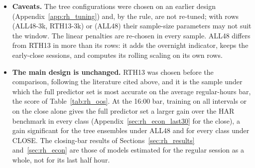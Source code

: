 \begin{itemize}
\item \textbf{Caveats.} The tree configurations were chosen on an earlier design (Appendix~\ref{app:rh_tuning}) and,
  by the rule, are not re-tuned; with \rhtaRowsSmall{} rows (ALL48-3k, RTH13-3k) or \rhtaRowsAll{} (ALL48) their
  sample-size parameters may not suit the window. The linear penalties are re-chosen in every sample. ALL48 differs
  from RTH13 in more than its rows: it adds the overnight indicator, keeps the early-close sessions, and computes its
  rolling scaling on its own rows.
\item \textbf{The main design is unchanged.} RTH13 was chosen before the comparison, following the literature cited
  above, and it is the sample under which the full predictor set is most accurate on the average regular-hours bar,
  the score of Table~\ref{tab:rh_oos}. At the 16:00 bar, training on all \rhtaNIntervals{} intervals or on the close
  alone gives the full predictor set a larger gain over the HAR benchmark in every class
  (Appendix~\ref{sec:rh_econ_last30} for the close), a gain significant for the tree ensembles under ALL48 and for
  every class under CLOSE. The closing-bar results of Sections~\ref{sec:rh_results} and~\ref{sec:rh_econ} are those
  of models estimated for the regular session as a whole, not for its last half hour.
\end{itemize}



